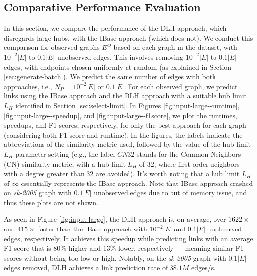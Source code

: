 \subsection{Comparative Performance Evaluation}

In this section, we compare the performance of the DLH approach, which disregards large hubs, with the IBase approach (which does not). We conduct this comparison for observed graphs $E^O$ based on each graph in the dataset, with $10^{-2}|E|$ to $0.1|E|$ unobserved edges. This involves removing $10^{-2}|E|$ to $0.1|E|$ edges, with endpoints chosen uniformly at random (as explained in Section \ref{sec:generate-batch}). We predict the same number of edges with both approaches, i.e., $N_P = 10^{-2}|E|$ or $0.1|E|$. For each observed graph, we predict links using the IBase approach and the DLH approach with a suitable hub limit $L_H$ identified in Section \ref{sec:select-limit}. In Figures \ref{fig:input-large--runtime}, \ref{fig:input-large--speedup}, and \ref{fig:input-large--f1score}, we plot the runtimes, speedups, and F1 scores, respectively, for only the best approach for each graph (considering both F1 score and runtime). In the figures, the labels indicate the abbreviations of the similarity metric used, followed by the value of the hub limit $L_H$ parameter setting (e.g., the label $CN32$ stands for the Common Neighbors (CN) similarity metric, with a hub limit $L_H$ of $32$, where first order neighbors with a degree greater than $32$ are avoided). It's worth noting that a hub limit $L_H$ of $\infty$ essentially represents the IBase approach. Note that IBase approach crashed on \textit{sk-2005} graph with $0.1|E|$ unobserved edges due to out of memory issue, and thus these plots are not shown.





As seen in Figure \ref{fig:input-large}, the DLH approach is, on average, over $1622\times$ and $415\times$ faster than the IBase approach with $10^{-2}|E|$ and $0.1|E|$ unobserved edges, respectively. It achieves this speedup while predicting links with an average F1 score that is $80\%$ higher and $13\%$ lower, respectively --- meaning similar F1 scores without being too low or high. Notably, on the \textit{sk-2005} graph with $0.1|E|$ edges removed, DLH achieves a link prediction rate of $38.1M$ edges/s.


